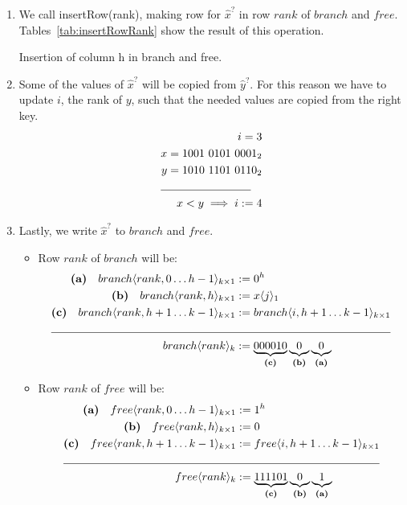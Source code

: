 \begin{enumerate}
    \item
    We call {\ttfamily insertRow(rank)}, making row for $\hat x^?$ in row $rank$ of $branch$ and $free$. Tables~\ref{tab:insertRowRank} show the result of this operation.
    \begin{table}[H]
    \centering
    
    \caption{Insertion of column h in branch and free.}
    \label{tab:insertRowRank}
    \end{table}
    
    \item
    Some of the values of $\hat x^?$ will be copied from $\hat y^?$. For this reason we have to update $i$, the rank of $y$, such that the needed values are copied from the right key.
    \begin{align*}
        i = 3 \\
        x = 1001\ 0101\ 0001_2 \\
        y = 1010\ 1101\ 0110_2 \\
        \cline{1-2}
        x < y \implies i:= 4
    \end{align*}
    
    \item
    Lastly, we write $\hat x^?$ to $branch$ and $free$.
    \begin{itemize}
        \item
        Row $rank$ of $branch$ will be:
        \begin{align*}
            \textbf{(a)}\quad branch\langle rank, 0 \dots h - 1 \rangle_{k \times 1} &:= 0^h\\
            \textbf{(b)}\quad branch\langle rank, h\rangle_{k \times 1} &:= x\langle j \rangle_1\\
            \textbf{(c)}\quad branch\langle rank, h + 1 \dots k - 1\rangle_{k \times 1} &:= branch\langle i, h + 1 \dots k - 1\rangle_{k \times 1}\\
            \cline{1-2}
            branch\langle rank \rangle_k &:=\underbrace{000010}_{\textbf{(c)}} \underbrace{0}_{\textbf{(b)}} \underbrace{0}_{\textbf{(a)}}
        \end{align*}
        
        \item
        Row $rank$ of $free$ will be:
        \begin{align*}
            \textbf{(a)}\quad free\langle rank, 0 \dots h - 1 \rangle_{k \times 1} &:= 1^h \\
            \textbf{(b)}\quad free\langle rank, h\rangle_{k \times 1} &:= 0 \\
            \textbf{(c)}\quad free\langle rank, h + 1 \dots k - 1\rangle_{k \times 1} &:= free\langle i, h + 1 \dots k - 1\rangle_{k \times 1} \\
            \cline{1-2}
            free\langle rank \rangle_k &:=\underbrace{111101}_{\textbf{(c)}} \underbrace{0}_{\textbf{(b)}} \underbrace{1}_{\textbf{(a)}}
        \end{align*}
    \end{itemize}


\end{enumerate}
